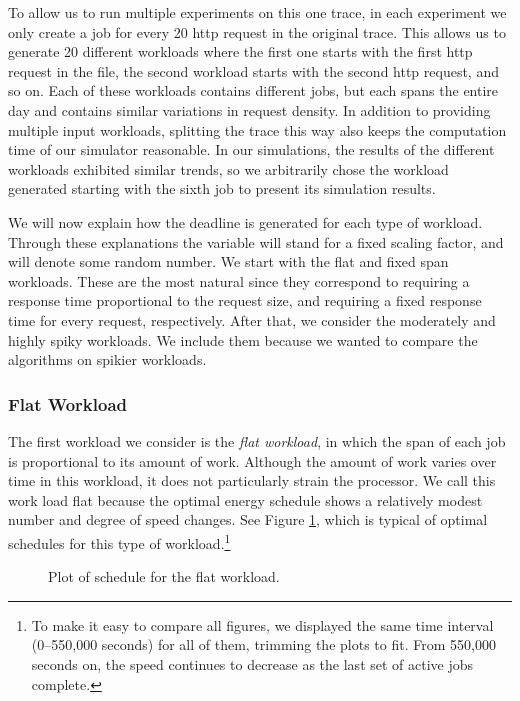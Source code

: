 \documentclass[11pt]{article}
\begin{document}
To allow us to run multiple experiments on this one trace, in each
experiment we only create a job for every 20 http
request in the original trace. This allows us to generate 20 different
workloads where the first one starts with the first http request in
the file, the second workload starts with the second http request, and
so on. 
Each of these workloads contains different jobs, but each spans the
entire day and contains similar variations in request density.
In addition to providing multiple input workloads, splitting the trace
this way also keeps the computation time of our simulator reasonable. In our simulations, the results of the different workloads exhibited similar trends, so we arbitrarily chose the workload generated starting with the sixth job to present its simulation results.


We will now explain how the deadline is generated for each type of
workload. Through these explanations the variable  will stand
for a fixed scaling factor, and  will denote some random number.
We start with the flat and fixed span workloads. These
are the most natural since they correspond to requiring
a response time proportional to the request size, and requiring a fixed
response time for every request, respectively. After that, we
consider the moderately and highly spiky workloads. We include them
because we wanted to compare the algorithms on spikier workloads.


\subsubsection{Flat Workload}
The first workload we consider is the {\em flat workload}, in which
the span of each job is proportional to its amount of work.
Although the amount of work varies over time in this workload, it 
does not particularly strain the processor.
We call this work load flat because the optimal energy schedule shows
a relatively modest number and degree of speed changes.
See Figure \ref{fig:YDS_Flat}, which is typical of optimal schedules for
this type of workload.\footnote{To make it easy to compare all
  figures, we displayed the same time interval (0--550,000 seconds)
  for all of them, trimming the plots to fit.
  From 550,000 seconds on, the speed continues to decrease as the
  last set of active jobs complete.}

\begin{figure}
\centering
{}
\caption{Plot of  schedule for the flat workload.}
\label{fig:YDS_Flat}
\end{figure}
\end{document}
